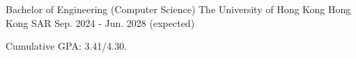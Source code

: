 

\begin{cventries}

  \cventry
    {Bachelor of Engineering (Computer Science)} %
    {The University of Hong Kong} %
    {Hong Kong SAR} %
    {Sep. 2024 - Jun. 2028 (expected)} %
    {
      \begin{cvitems} %
        \item {Cumulative GPA: 3.41/4.30.}
      \end{cvitems}
    }

\end{cventries}
